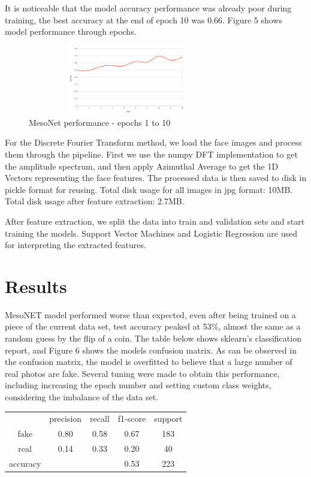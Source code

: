 \documentclass{bmvc2k}
\begin{document}
It is noticeable that the model accuracy performance was already poor during training, the best accuracy at the end of epoch 10 was 0.66. Figure 5 shows model performance through epochs.

\begin{figure}[!h]
\centering
\includegraphics[width=8.6cm, height=3.0cm]{Figs/train-performance-mesonet.png}
    \caption{MesoNet performance - epochs 1 to 10}
\end{figure}

\hspace{1.5cm}

For the Discrete Fourier Transform method, we load the face images and process them through the pipeline. First we use the numpy DFT implementation to get the amplitude spectrum, and then apply Azimuthal Average to get the 1D Vectors representing the face features. The processed data is then saved to disk in pickle format for reusing. Total disk usage for all images in jpg format: 10MB. Total disk usage after feature extraction: 2.7MB.

After feature extraction, we split the data into train and validation sets and start training the models. Support Vector Machines and Logistic Regression are used for interpreting the extracted features.

\section{Results}

MesoNET model performed worse than expected, even after being trained on a piece of the current data set, test accuracy peaked at 53\%, almost the same as a random guess by the flip of a coin. The table below shows sklearn's classification report, and Figure 6 shows the models confusion matrix. As can be observed in the confusion matrix, the model is overfitted to believe that a large number of real photos are fake. Several tuning were made to obtain this performance, including increasing the epoch number and setting custom class weights, considering the imbalance of the data set.

\begin{center}
\begin{tabular}{ c c c c c }
  & precision & recall & f1-score & support \\
 fake & 0.80 & 0.58 & 0.67 & 183 \\ 
 real &  0.14 & 0.33 & 0.20 & 40 \\
 accuracy &  &  & 0.53 & 223
\end{tabular}
\end{center}
\end{document}
